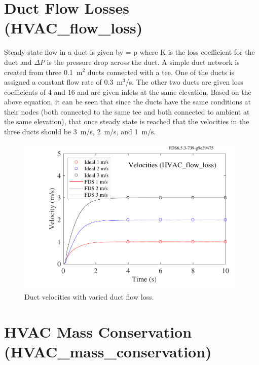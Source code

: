 \documentclass[11pt]{book}
\begin{document}
\section{Duct Flow Losses (HVAC\_flow\_loss)}

Steady-state flow in a duct is given by
\be {} = \Delta p \label {HVAC_steady_state}\ee
where K is the loss coefficient for the duct and $\Delta P$ is the pressure drop across the duct.  A simple duct network is created from three 0.1~m$^2$ ducts connected with a tee.  One of the ducts is assigned a constant flow rate of 0.3~m$^3$/s.  The other two ducts are given loss coefficients of 4 and 16 and are given inlets at the same elevation.  Based on the above equation, it can be seen that since the ducts have the same conditions at their nodes (both connected to the same tee and both connected to ambient at the same elevation), that once steady state is reached that the velocities in the three ducts should be 3~m/s, 2~m/s, and 1~m/s.

\begin{figure}[ht]
   \begin{center}
      \includegraphics[height=3.00in]{SCRIPT_FIGURES/HVAC_flow_loss.pdf}
     \caption{\label{fig_HVAC_loss} Duct velocities with varied duct flow loss.}
   \end{center}
\end{figure}

\clearpage


\section{HVAC Mass Conservation (HVAC\_mass\_conservation)}
\end{document}

